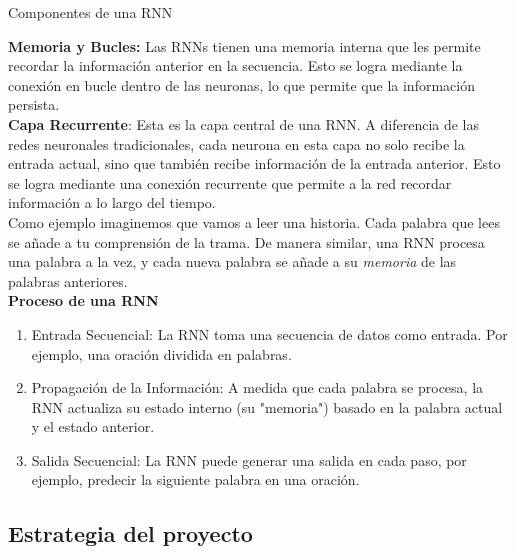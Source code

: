 \begin{center}
    Componentes de una RNN
\end{center}

\textbf{Memoria y Bucles:} Las RNNs tienen una memoria interna que les permite recordar la 
información anterior en la secuencia. Esto se logra mediante la conexión en bucle dentro de las 
neuronas, lo que permite que la información persista.\\

\textbf{Capa Recurrente}: Esta es la capa central de una RNN. A diferencia de las redes neuronales 
tradicionales, cada neurona en esta capa no solo recibe la entrada actual, sino que también 
recibe información de la entrada anterior. Esto se logra mediante una conexión recurrente 
que permite a la red recordar información a lo largo del tiempo.\\ 

Como ejemplo imaginemos que vamos a leer una historia. Cada palabra que lees se añade a tu 
comprensión de la trama. De manera similar, una RNN procesa una palabra a la vez, y cada 
nueva palabra se añade a su \textit{memoria} de las palabras anteriores.\\ 

\textbf{Proceso de una RNN}

\begin{enumerate}
    \item Entrada Secuencial: La RNN toma una secuencia de datos como entrada. Por ejemplo, 
    una oración dividida en palabras.
    \item Propagación de la Información: A medida que cada palabra se procesa, la RNN actualiza 
    su estado interno (su "memoria") basado en la palabra actual y el estado anterior.
    \item Salida Secuencial: La RNN puede generar una salida en cada paso, por ejemplo, 
    predecir la siguiente palabra en una oración.
\end{enumerate}


\subsection{Estrategia del proyecto}

